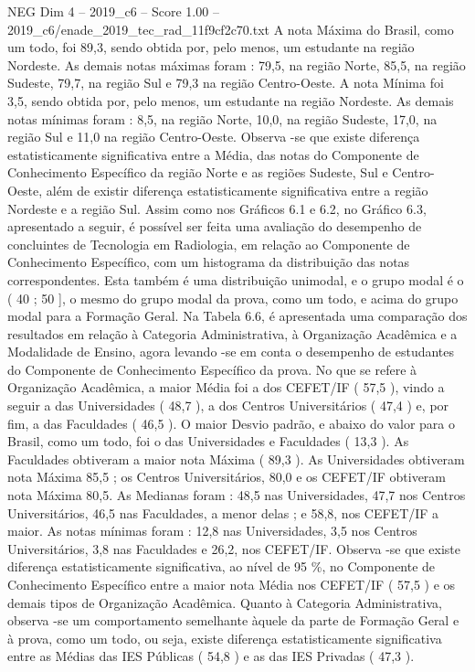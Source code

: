 \begin{textsample}{NEG Dim 4 – 2019\_c6 – Score 1.00 – 2019\_c6/enade\_2019\_tec\_rad\_11f9cf2c70.txt}
A nota Máxima do Brasil, como um todo, foi 89,3, sendo obtida por, pelo menos, um estudante na região Nordeste.
As demais notas máximas foram : 79,5, na região Norte, 85,5, na região Sudeste, 79,7, na região Sul e 79,3 na região Centro-Oeste.
A nota Mínima foi 3,5, sendo obtida por, pelo menos, um estudante na região Nordeste.
As demais notas mínimas foram : 8,5, na região Norte, 10,0, na região Sudeste, 17,0, na região Sul e 11,0 na região Centro-Oeste.
Observa -se que existe diferença estatisticamente significativa entre a Média, das notas do Componente de Conhecimento Específico da região Norte e as regiões Sudeste, Sul e Centro-Oeste, além de existir diferença estatisticamente significativa entre a região Nordeste e a região Sul.
Assim como nos Gráficos 6.1 e 6.2, no Gráfico 6.3, apresentado a seguir, é possível ser feita uma avaliação do desempenho de concluintes de Tecnologia em Radiologia, em relação ao Componente de Conhecimento Específico, com um histograma da distribuição das notas correspondentes.
Esta também é uma distribuição unimodal, e o grupo modal é o ( 40 ; 50 ], o mesmo do grupo modal da prova, como um todo, e acima do grupo modal para a Formação Geral.
Na Tabela 6.6, é apresentada uma comparação dos resultados em relação à Categoria Administrativa, à Organização Acadêmica e a Modalidade de Ensino, agora levando -se em conta o desempenho de estudantes do Componente de Conhecimento Específico da prova.
No que se refere à Organização Acadêmica, a maior Média foi a dos CEFET/IF ( 57,5 ), vindo a seguir a das Universidades ( 48,7 ), a dos Centros Universitários ( 47,4 ) e, por fim, a das Faculdades ( 46,5 ).
O maior Desvio padrão, e abaixo do valor para o Brasil, como um todo, foi o das Universidades e Faculdades ( 13,3 ).
As Faculdades obtiveram a maior nota Máxima ( 89,3 ).
As Universidades obtiveram nota Máxima 85,5 ; os Centros Universitários, 80,0 e os CEFET/IF obtiveram nota Máxima 80,5.
As Medianas foram : 48,5 nas Universidades, 47,7 nos Centros Universitários, 46,5 nas Faculdades, a menor delas ; e 58,8, nos CEFET/IF a maior.
As notas mínimas foram : 12,8 nas Universidades, 3,5 nos Centros Universitários, 3,8 nas Faculdades e 26,2, nos CEFET/IF.
Observa -se que existe diferença estatisticamente significativa, ao nível de 95 \%, no Componente de Conhecimento Específico entre a maior nota Média nos CEFET/IF ( 57,5 ) e os demais tipos de Organização Acadêmica.
Quanto à Categoria Administrativa, observa -se um comportamento semelhante àquele da parte de Formação Geral e à prova, como um todo, ou seja, existe diferença estatisticamente significativa entre as Médias das IES Públicas ( 54,8 ) e as das IES Privadas ( 47,3 ).

\end{textsample}
